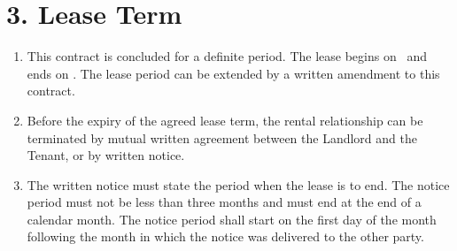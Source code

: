 \section*{3. Lease Term}

\begin{enumerate}[label=\arabic*.]
    \item This contract is concluded for a definite period. The lease begins on \Rentstartdate \ and ends on \Rentenddate. The lease period can be extended by a written amendment to this contract.
    \item Before the expiry of the agreed lease term, the rental relationship can be terminated by mutual written agreement between the Landlord and the Tenant, or by written notice.
    \item The written notice must state the period when the lease is to end. The notice period must not be less than three months and must end at the end of a calendar month. The notice period shall start on the first day of the month following the month in which the notice was delivered to the other party.
\end{enumerate}
